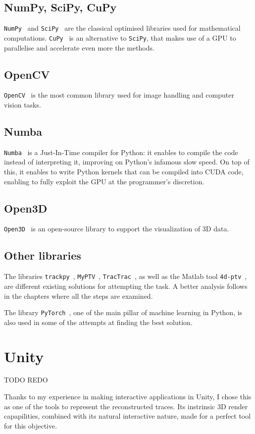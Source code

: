 \subsection{NumPy, SciPy, CuPy}

\texttt{NumPy}~\cite{numpy} and \texttt{SciPy}~\cite{scipy} are the classical optimised libraries used for mathematical computations.
\texttt{CuPy}~\cite{cupy} is an alternative to \texttt{SciPy}, that makes use of a GPU to parallelise and accelerate even more the methods.

\subsection{OpenCV}

\texttt{OpenCV}~\cite{opencv} is the most common library used for image handling and computer vision tasks.

\subsection{Numba}

\texttt{Numba}~\cite{numba} is a Just-In-Time compiler for Python: it enables to compile the code instead of interpreting it, improving on Python's infamous slow speed.
On top of this, it enables to write Python kernels that can be compiled into CUDA code, enabling to fully exploit the GPU at the programmer's discretion.

\subsection{Open3D}

\texttt{Open3D}~\cite{open3d} is an open-source library to support the visualization of 3D data.

\subsection{Other libraries}

The libraries \texttt{trackpy}~\cite{trackpy}, \texttt{MyPTV}~\cite{myptv}, \texttt{TracTrac}~\cite{tractrac}, as well as the Matlab tool \texttt{4d-ptv}~\cite{fourdptv}, are different existing solutions for attempting the task. A better analysis follows in the chapters where all the steps are examined.

The library \texttt{PyTorch}~\cite{pytorch}, one of the main pillar of machine learning in Python, is also used in some of the attempts at finding the best solution.

\section{Unity}

TODO REDO

Thanks to my experience in making interactive applications in Unity, I chose this as one of the tools to represent the reconstructed traces.
Its instrinsic 3D render capapilities, combined with its natural interactive nature, made for a perfect tool for this objective.
